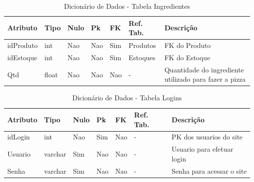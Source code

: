 \documentclass[
	12pt,				%
	openright,			%
	oneside,			%
	a4paper,			%
	chapter=TITLE,		%
	section=TITLE,		%
	english,			%
	brazil				%
	]{abntex2}
\begin{document}
    \begin{table}[htbp]
        \caption{Dicionário de Dados - Tabela Ingredientes}
        \label{tb1_dicionario_dados_ingredientes}
        \begin{tabular}{|l|l|l|l|l|l|p{3cm}|}
            \hline
            \textbf{Atributo} & 
            \textbf{Tipo} & 
            \textbf{Nulo} & 
            \textbf{Pk} & 
            \textbf{FK} & 
            \textbf{Ref. Tab.} & 
            \textbf{Descrição} \\ \hline
            idProduto & int & Nao & Nao & Sim & Produtos & FK do Produto \\ \hline
            idEstoque & int & Nao & Nao & Sim & Estoques & FK do Estoque \\ \hline
            Qtd & float & Nao & Nao & Nao & - & Quantidade do ingrediente utilizado para fazer a pizza \\ \hline
        \end{tabular}
    \end{table}
    
    \begin{table}[htbp]
        \caption{Dicionário de Dados - Tabela Logins}
        \label{tb1_dicionario_dados_logins}
        \begin{tabular}{|l|l|l|l|l|l|p{3cm}|}
            \hline
            \textbf{Atributo} & 
            \textbf{Tipo} & 
            \textbf{Nulo} & 
            \textbf{Pk} & 
            \textbf{FK} & 
            \textbf{Ref. Tab.} & 
            \textbf{Descrição} \\ \hline
            idLogin & int & Nao & Sim & Nao & - & PK dos usuarios do site \\ \hline
            Usuario & varchar & Sim & Nao & Nao & - & Usuario para efetuar login \\ \hline
            Senha & varchar & Sim & Nao & Nao & - & Senha para acessar o site \\ \hline
        \end{tabular}
    \end{table}
    
\end{document}
